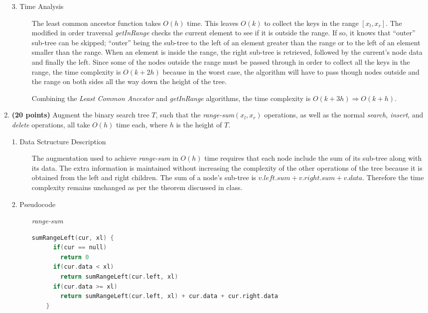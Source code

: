 \documentclass[11pt]{article}
\begin{document}
\begin{enumerate}
\begin{description}
  \item[3. Time Analysis]
    The least common ancestor function takes $O(h)$ time. This leaves $O(k)$ to collect the keys in the range $[x_l, x_r]$. The modified in order traversal {\em getInRange} checks the current element to see if it is outside the range. If so, it knows that ``outer'' sub-tree can be skipped; ``outer'' being the sub-tree to the left of an element greater than the range or to the left of an element smaller than the range. When an element is inside the range, the right sub-tree is retrieved, followed by the current's node data and finally the left. Since some of the nodes outside the range must be passed through in order to collect all the keys in the range, the time complexity is $O(k+2h)$ because in the worst case, the algorithm will have to pass though nodes outside and the range on both sides all the way down the height of the tree.

    Combining the {\em Least Common Ancestor} and {\em getInRange} algorithms, the time complexity is $O(k+3h) \Rightarrow O(k+h)$.

\end{description}
\item %
{\bf (20 points)}
Augment the binary search tree $T$, such that the {\em range-sum}$(x_l,x_r)$ operations, as well as the normal {\em search, insert}, and {\em delete} operations, all take $O(h)$ time each, where $h$ is the height of $T$.

\begin{description}
  \item[1. Data Sctructure Description]

    The augmentation used to achieve {\em range-sum} in $O(h)$ time requires that each node include the sum of its sub-tree along with its data. The extra information is maintained without increasing the complexity of the other operations of the tree because it is obtained from the left and right children. The sum of a node's sub-tree is $v.left.sum + v.right.sum + v.data$. Therefore the time complexity remains unchanged as per the theorem discussed in class.

    \newpage
  \item[2. Pseudocode]
    \textit{range-sum}
    \begin{lstlisting}[language=C++]
    sumRangeLeft(cur, xl) {
      if(cur == null)
        return 0
      if(cur.data < xl)
        return sumRangeLeft(cur.left, xl)
      if(cur.data >= xl)
        return sumRangeLeft(cur.left, xl) + cur.data + cur.right.data
    }


\end{lstlisting}
\end{description}
\end{enumerate}
\end{document}

